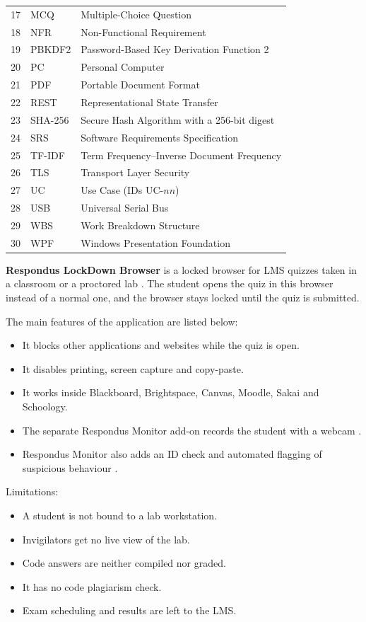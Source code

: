 \begin{longtable}{cl>{\raggedright\arraybackslash}p{9.6cm}}
17 & MCQ & Multiple-Choice Question \\
18 & NFR & Non-Functional Requirement \\
19 & PBKDF2 & Password-Based Key Derivation Function 2 \\
20 & PC & Personal Computer \\
21 & PDF & Portable Document Format \\
22 & REST & Representational State Transfer \\
23 & SHA-256 & Secure Hash Algorithm with a 256-bit digest \\
24 & SRS & Software Requirements Specification \\
25 & TF-IDF & Term Frequency--Inverse Document Frequency \\
26 & TLS & Transport Layer Security \\
27 & UC & Use Case (IDs UC-$nn$) \\
28 & USB & Universal Serial Bus \\
29 & WBS & Work Breakdown Structure \\
30 & WPF & Windows Presentation Foundation \\
\end{longtable}

\noindent\textbf{Respondus LockDown Browser} is a locked browser for LMS quizzes taken in a classroom or a proctored lab \cite{respondus1}. The student opens the quiz in this browser instead of a normal one, and the browser stays locked until the quiz is submitted.

\noindent The main features of the application are listed below:
\begin{itemize}[noitemsep]
\item It blocks other applications and websites while the quiz is open.
\item It disables printing, screen capture and copy-paste.
\item It works inside Blackboard, Brightspace, Canvas, Moodle, Sakai and Schoology.
\item The separate Respondus Monitor add-on records the student with a webcam \cite{respondus_monitor}.
\item Respondus Monitor also adds an ID check and automated flagging of suspicious behaviour \cite{respondus_webcam}.
\end{itemize}

\noindent Limitations:
\begin{itemize}[noitemsep]
\item A student is not bound to a lab workstation.
\item Invigilators get no live view of the lab.
\item Code answers are neither compiled nor graded.
\item It has no code plagiarism check.
\item Exam scheduling and results are left to the LMS.
\end{itemize}

